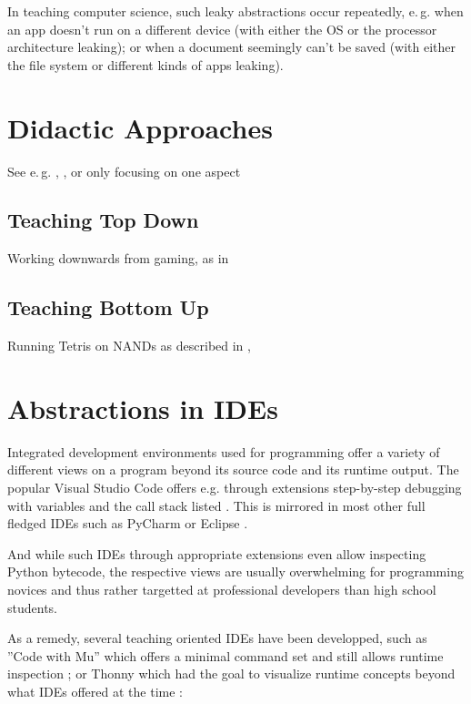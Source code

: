 In teaching computer science, such leaky abstractions occur repeatedly, e.\,g. when an app doesn't run on a different device (with either the OS or the processor architecture leaking); or when a document seemingly can't be saved (with either the file system or different kinds of apps leaking).




\section{Didactic Approaches} \label{sc_didactic}
See e.\,g. \cite{Sch11}, \cite{Mod16}, \cite{Har20} or \cite{Lee20} only focusing on one aspect

\subsection{Teaching Top Down}
Working downwards from gaming, as in \cite{Wei16}

\subsection{Teaching Bottom Up}
Running Tetris on NANDs as described in \cite{Cak17}, \cite{Nis21}


\section{Abstractions in IDEs} \label{sc_ides}

Integrated development environments used for programming offer a variety of different views on a program beyond its source code and its runtime output. The popular Visual Studio Code offers e.g. through extensions step-by-step debugging with variables and the call stack listed \cite{Mic25}. This is mirrored in most other full fledged IDEs such as PyCharm \citep{Jet25} or Eclipse \citep{Ecl25}.

And while such IDEs through appropriate extensions even allow inspecting Python bytecode, the respective views are usually overwhelming for programming novices and thus rather targetted at professional developers than high school students.

As a remedy, several teaching oriented IDEs have been developped, such as ''Code with Mu'' which offers a minimal command set and still allows runtime inspection \citep{Tol23}; or Thonny which had the goal to visualize runtime concepts beyond what IDEs offered at the time \citep[p. 119]{Ann15}:

